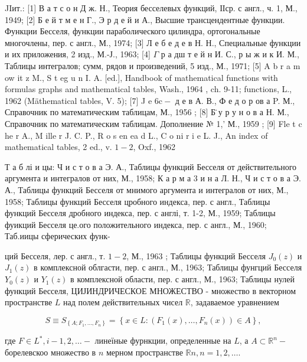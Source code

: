 \documentclass[10pt]{article}
\begin{document}
JIит.: [1] В а т с о н Д ж. Н., Теория бесселевых функций, ІІср. с англ., ч. 1, М., 1949; [2] Б е й т м е н Г., Э р д е й и А., Высшие трансцендентные функции. Функции Бесселя, функции параболического цилиндра, ортогональные многочлены, пер. с англ., М., 1974; [3] Л е б е д е в Н. Н., Специальные функции и их приложения, 2 изд., М.-Ј., 1963; [4] $\Gamma$ р а дш т е й н И. С., р ы ж и к И. М., Таблицы интегралов; сумм, рядов и произведений, 5 изд., М., 1971; [5] A b r a m ow it z M., S t eg u n I. A. [ed.], Handbook of mathematical functions with formulas graphs and mathematical tables, Wash., 1964 , ch. 9-11; functions, L., 1962 (Mäthematical tables, V. 5); [7] J e $6 \mathrm{c}-$ д е в А. В., Ф е д о р ов а P. М., Справочник по математическим таблицам, М., 1956 ; [8] Б̈ у р у н о в а Н. М., Справочник по математическим таблицам. Дополнение № 1,' М., 1959 ; [9] Fle t c he r A., M ille r J. C. P., R o s en ea d L., C o ni r i e L. J., An index of mathematical tables, 2 ed., v. $1-2$, Oxf., 1962



Т а б лі и цы: Ч и с т о в а Э. А., Таблицы функций Бесселя от действительного аргумента и интегралов от них, М., 1958; К а р м а 3 и н а Л. Н., Ч и с т о в а Э. А., Таблицы функций Бесселя от мнимого аргумента и интегралов от них, М., 1958; Таблицы функций Бесселя цробного индекса, пер. с англ., Таблицы функций Бесселя дробного индекса, пер. с англі, т. 1-2, М., 1959; Таблицы фуикций Бесселя це.ого положительного индекса, пер. с англ., М., 1960; Таб.иицы сферических функ-

ций Бесселя, лер. с англ., т. $1-2$, М., 1963 ; Таблицы функций Бесселя $J_{0}(z)$ и $J_{1}(z)$ в комплексной облгасти, пер. с англ., М., 1963; Таблицы фунгций Бесселя $Y_{0}(z)$ и $Y_{1}(z)$ в комплексной области, пер. с англ., М., 1963; Таблицы нулей функций Бесселя, ЦИЈИНДРИЧЕСКОЕ МНОЖЕСТВО - множество в векторном пространстве $L$ над полем действительных чисел $\mathbb{R}$, задаваемое уравнением



\[

S \equiv S_{\left\{A ; F_{1}, \ldots, F_{n}\right\}}=\left\{x \in L:\left(F_{1}(x), \ldots, F_{n}(x)\right) \in A\right\},

\]



где $F \in L^{*}, i-1,2, \ldots-$ линеїные фурнкции, определенные на $L$, а $A \subset \mathbb{R}^{n}-$ борелевскоо множество в $n$ мерном пространстве $\mathbb{R} n, n=1,2, \ldots$.
\end{document}
